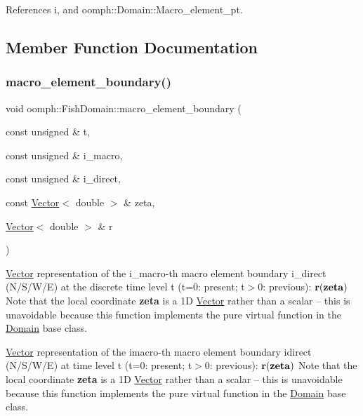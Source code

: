 References i, and oomph\+::\+Domain\+::\+Macro\+\_\+element\+\_\+pt.



\subsection{Member Function Documentation}
\mbox{\label{classoomph_1_1FishDomain_a383b0fb396d605932ba6fb0779dacbf9}} 
\subsubsection{\texorpdfstring{macro\+\_\+element\+\_\+boundary()}{macro\_element\_boundary()}}
{\footnotesize\ttfamily void oomph\+::\+Fish\+Domain\+::macro\+\_\+element\+\_\+boundary (\begin{DoxyParamCaption}\item[{const unsigned \&}]{t,  }\item[{const unsigned \&}]{i\+\_\+macro,  }\item[{const unsigned \&}]{i\+\_\+direct,  }\item[{const \hyperlink{classoomph_1_1Vector}{Vector}$<$ double $>$ \&}]{zeta,  }\item[{\hyperlink{classoomph_1_1Vector}{Vector}$<$ double $>$ \&}]{r }\end{DoxyParamCaption})\hspace{0.3cm}{\ttfamily [virtual]}}



\hyperlink{classoomph_1_1Vector}{Vector} representation of the i\+\_\+macro-\/th macro element boundary i\+\_\+direct (N/\+S/\+W/E) at the discrete time level t (t=0\+: present; t$>$0\+: previous)\+: $ {\bf r}({\bf zeta}) $ Note that the local coordinate {\bfseries zeta} is a 1D \hyperlink{classoomph_1_1Vector}{Vector} rather than a scalar -- this is unavoidable because this function implements the pure virtual function in the \hyperlink{classoomph_1_1Domain}{Domain} base class. 

\hyperlink{classoomph_1_1Vector}{Vector} representation of the imacro-\/th macro element boundary idirect (N/\+S/\+W/E) at time level t (t=0\+: present; t$>$0\+: previous)\+: $ {\bf r}({\bf zeta}) $ Note that the local coordinate {\bfseries zeta} is a 1D \hyperlink{classoomph_1_1Vector}{Vector} rather than a scalar -- this is unavoidable because this function implements the pure virtual function in the \hyperlink{classoomph_1_1Domain}{Domain} base class. 

